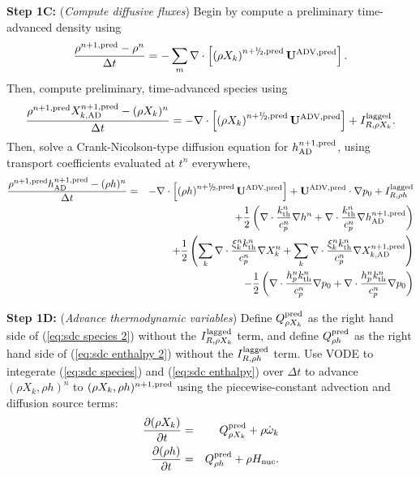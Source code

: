 {\bf Step 1C:} ({\it Compute diffusive fluxes}) Begin by compute a preliminary time-advanced density using
\begin{equation}
\frac{\rho^{n+1,{\rm pred}} - \rho^n}{\Delta t} = -\sum_m\nabla\cdot\left[\left(\rho X_k\right)^{n+\myhalf,{\rm pred}}\uadvsdcpred\right].
\end{equation}
Then, compute preliminary, time-advanced species using
\begin{equation}
\frac{\rho^{n+1,{\rm pred}}X_{k,{\rm AD}}^{n+1,{\rm pred}} - (\rho X_k)^n}{\Delta t} = -\nabla\cdot\left[\left(\rho X_k\right)^{n+\myhalf,{\rm pred}}\uadvsdcpred\right] + I_{R,\rho X_k}^{\rm lagged}.\label{eq:sdc species 2}
\end{equation}
Then, solve a Crank-Nicolson-type diffusion equation for $h^{n+1,{\rm pred}}_{\rm AD}$, using transport coefficients evaluated at $t^n$ everywhere,
\begin{eqnarray}
\frac{\rho^{n+1,{\rm pred}}h^{n+1,{\rm pred}}_{\rm AD} - (\rho h)^n}{\Delta t} &=& -\nabla\cdot\left[\left(\rho h\right)^{n+\myhalf,{\rm pred}}\uadvsdcpred\right] + \uadvsdcpred\cdot\nabla p_0 + I_{R,\rho h}^{\rm lagged}\nonumber\\
&& + \half\left(\nabla\cdot\frac{\kth^n}{c_p^n}\nabla h^n + \nabla\cdot\frac{\kth^n}{c_p^n}\nabla h_{\rm AD}^{n+1,{\rm pred}}\right)\nonumber\\
&& + \half\left(\sum_k\nabla\cdot\frac{\xi_k^n k_{\rm th}^n}{c_p^n}\nabla X_k^n + \sum_k\nabla\cdot\frac{\xi_k^n k_{\rm th}^n}{c_p^n}\nabla X_{k,{\rm AD}}^{n+1,{\rm pred}}\right)\nonumber\\
&& - \half\left(\nabla\cdot\frac{h_p^n k_{\rm th}^n}{c_p^n}\nabla p_0 + \nabla\cdot\frac{h_p^n k_{\rm th}^n}{c_p^n}\nabla p_0\right)\label{eq:sdc enthalpy 2}
\end{eqnarray}

{\bf Step 1D:} ({\it Advance thermodynamic variables}) Define $Q_{\rho X_k}^{\rm pred}$ as the right hand side of (\ref{eq:sdc species 2}) without the $I_{R,\rho X_k}^{\rm lagged}$ term, and define $Q_{\rho h}^{\rm pred}$ as the right hand side of (\ref{eq:sdc enthalpy 2}) without the $I_{R,\rho h}^{\rm lagged}$ term.  Use VODE to integerate (\ref{eq:sdc species}) and (\ref{eq:sdc enthalpy}) over $\Delta t$ to advance $(\rho X_k, \rho h)^n$ to $(\rho X_k, \rho h)^{n+1,{\rm pred}}$ using the piecewise-constant advection and diffusion source terms:
\begin{eqnarray}
\frac{\partial(\rho X_k)}{\partial t} &=& Q_{\rho X_k}^{\rm pred} + \rho\dot\omega_k\\
\frac{\partial(\rho h)}{\partial t} &=& Q_{\rho h}^{\rm pred} + \rho{H_{\rm nuc}}.
\end{eqnarray}

